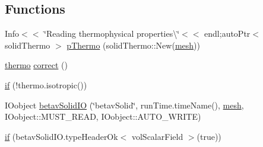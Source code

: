 \subsection*{Functions}
\begin{DoxyCompactItemize}
\item 
Info$<$$<$ \char`\"{}Reading thermophysical properties\textbackslash{}\char`\"{}$<$$<$ endl;auto\+Ptr$<$ solid\+Thermo $>$ \hyperlink{FMU4FOAM_2application_2solver_2solidFoamAdjustTime_2createFields_8H_add12555826200b51edddb1a224af2dea}{p\+Thermo} (solid\+Thermo\+::\+New(\hyperlink{createMeshesPostProcess_8H_a8bb1e58291d2d2b653e024a4f4bffe38}{mesh}))
\item 
\hyperlink{EEqns__2p_8H_a9d615e711281a88a96c648787c7dbd32}{thermo} \hyperlink{FMU4FOAM_2application_2solver_2solidFoamAdjustTime_2createFields_8H_a3a2458f7f54158be848527a3fdedd5dd}{correct} ()
\item 
\hyperlink{FMU4FOAM_2application_2solver_2solidFoamAdjustTime_2createFields_8H_a95ef98f6be3b8b09a3eca31669e176dd}{if} (!thermo.\+isotropic())
\item 
I\+Oobject \hyperlink{FMU4FOAM_2application_2solver_2solidFoamAdjustTime_2createFields_8H_a877a44e22347ac328808bb808bb92e15}{betav\+Solid\+IO} (\char`\"{}betav\+Solid\char`\"{}, run\+Time.\+time\+Name(), \hyperlink{createMeshesPostProcess_8H_a8bb1e58291d2d2b653e024a4f4bffe38}{mesh}, I\+Oobject\+::\+M\+U\+S\+T\+\_\+\+R\+E\+AD, I\+Oobject\+::\+A\+U\+T\+O\+\_\+\+W\+R\+I\+TE)
\item 
\hyperlink{FMU4FOAM_2application_2solver_2solidFoamAdjustTime_2createFields_8H_aed0d4cdbdd7de65c18a52de38e5826f2}{if} (betav\+Solid\+I\+O.\+type\+Header\+Ok$<$ vol\+Scalar\+Field $>$(true))
\end{DoxyCompactItemize}
